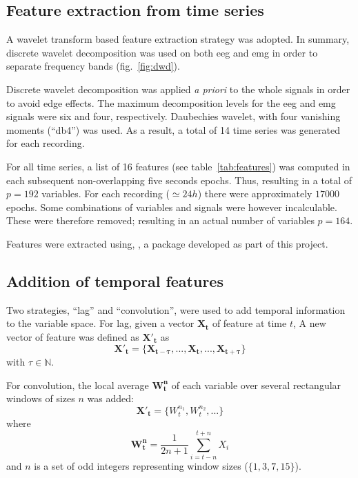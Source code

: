 \subsection{Feature extraction from time series}
\label{sub:features}

A wavelet transform based feature extraction strategy was adopted.
In summary, discrete wavelet decomposition was used on both \gls{eeg} and \gls{emg}
in order to separate frequency bands (fig.~\ref{fig:dwd}).



Discrete wavelet decomposition was applied \emph{a priori} to the whole signals in order to avoid edge effects.
The maximum decomposition levels for the \gls{eeg} and \gls{emg} signals were six and four, respectively.
Daubechies wavelet, with four vanishing moments (``db4'') was used.
As a result, a total of 14 time series was generated for each recording.

For all time series, a list of 16 features (see table~\ref{tab:features}) was computed in each subsequent non-overlapping five seconds epochs.
Thus, resulting in a total of $p=192$ variables. 
For each recording ($\simeq 24h$) there were approximately $17000$ epochs.
Some combinations of variables and signals were however incalculable.
These were therefore removed; resulting in an actual number of variables $p=164$.



Features were extracted using, \pr{}, a \py{} package developed as part of this project.


\subsection{Addition of temporal features}
Two strategies, ``lag'' and ``convolution'', were used to add temporal information to the variable space.
For lag, given a vector $\mathbf{X_t}$ of feature at time $t$,
A new vector of feature was defined as $\mathbf{{X'}_t}$ as
\begin{equation}
\mathbf{{X'}_t} = \{\mathbf{X_{t-\tau}}, ..., \mathbf{X_t}, ..., \mathbf{X_{t+\tau}}\}
\label{eq:tau}
\end{equation}
with $\tau \in \mathbb{N}$.

For convolution, the local average $\mathbf{W^n_t}$ of each variable over several rectangular windows of sizes $n$ was added:
\begin{equation}
\mathbf{{X'}_t} = \{W^{n_1}_t, W^{n_2}_t, ...\}
\label{eq:window}
\end{equation}
where
\[
\mathbf{W^n_t} = \frac{1}{2n+1} \sum_{i = t-n}^{t+n}{X_i}
\]
and $n$ is a set of odd integers representing window sizes (\eg $\{1,3,7,15\}$).



